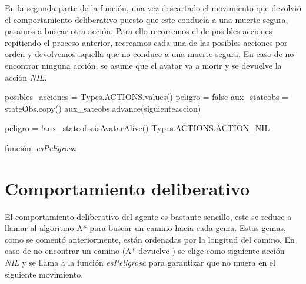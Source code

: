 \documentclass[size=a4, parskip=half, titlepage=false, toc=flat, toc=bib, 12pt]{scrartcl}
\begin{document}
En la segunda parte de la función, una vez descartado el movimiento que devolvió el comportamiento
deliberativo puesto que este conducía a una muerte segura, pasamos a buscar otra acción. Para ello
recorremos el  de posibles acciones repitiendo el proceso anterior, recreamos cada una
de las posibles acciones por orden y devolvemos aquella que no conduce a una muerte segura. En caso
de no encontrar ninguna acción, se asume que el avatar va a morir y se devuelve la acción \textit{NIL}.

\begin{algorithm}[H]
 posibles\_acciones = Types.ACTIONS.values()\;
 peligro = false\;
 aux\_stateobs = stateObs.copy()\;
 aux\_sateobs.advance(siguienteaccion)\;

 peligro = !aux\_stateobs.isAvatarAlive()\;
 \Return Types.ACTIONS.ACTION\_NIL\;
 \caption{función: \textit{esPeligrosa}}
\end{algorithm}

\newpage

\section{Comportamiento deliberativo}
El comportamiento deliberativo del agente es bastante sencillo, este se reduce
a llamar al algoritmo A* para buscar un camino hacia cada gema. Estas gemas,
como se comentó anteriormente, están ordenadas por la longitud del camino.
En caso de no encontrar un camino (A* devuelve ) se elige como
siguiente acción \textit{NIL} y se llama a la función \textit{esPeligrosa}
para garantizar que no muera en el siguiente movimiento.


\end{document}
